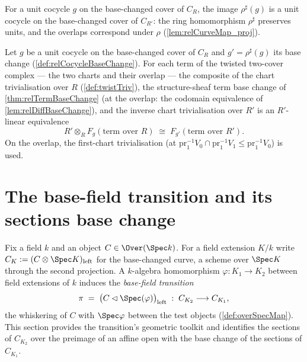 \begin{definition}
  \label{def:relCocycleBaseChange}
  \leanok
  For a unit cocycle \(g\) on the base-changed cover of \(C_R\), the image
  \(\rho^{\sharp}(g)\) is a unit cocycle on the base-changed cover of \(C_{R'}\): the
  ring homomorphism \(\rho^{\sharp}\) preserves units, and the overlaps correspond under
  \(\rho\) (\ref{lem:relCurveMap_proj}).
\end{definition}

\begin{definition}
  \label{def:relTwistTermBaseChange}
  \leanok
  Let \(g\) be a unit cocycle on the base-changed cover of \(C_R\) and
  \(g' = \rho^{\sharp}(g)\) its base change (\ref{def:relCocycleBaseChange}). For each
  term of the twisted two-cover complex --- the two charts and their overlap --- the
  composite of the chart trivialisation over \(R\) (\ref{def:twistTriv}), the
  structure-sheaf term base change of \ref{thm:relTermBaseChange} (at the overlap: the
  codomain equivalence of \ref{lem:relDiffBaseChange}), and the inverse chart
  trivialisation over \(R'\) is an \(R'\)-linear equivalence
  \[
    R' \otimes_R F_g(\text{term over } R) \;\cong\; F_{g'}(\text{term over } R') .
  \]
  On the overlap, the first-chart trivialisation (at
  \(\mathrm{pr}_1^{-1}V_0 \cap \mathrm{pr}_1^{-1}V_1 \le \mathrm{pr}_1^{-1}V_0\)) is
  used.
\end{definition}

\section{The base-field transition and its sections base change}
\label{sec:base_field_transition}

Fix a field \(k\) and an object \(C \in \Over(\Spec k)\). For a field extension \(K/k\)
write \(C_K := (C \otimes \Spec K)_{\mathrm{left}}\) for the base-changed curve, a scheme
over \(\Spec K\) through the second projection. A \(k\)-algebra homomorphism
\(\varphi : K_1 \to K_2\) between field extensions of \(k\) induces the
\emph{base-field transition}
\[
  \pi \;=\; \bigl(C \lhd \Spec(\varphi)\bigr)_{\mathrm{left}} \;:\; C_{K_2}
  \longrightarrow C_{K_1},
\]
the whiskering of \(C\) with \(\Spec\varphi\) between the test objects
(\ref{def:overSpecMap}). This section provides the transition's geometric toolkit and
identifies the sections of \(C_{K_2}\) over the preimage of an affine open with the base
change of the sections of \(C_{K_1}\).

